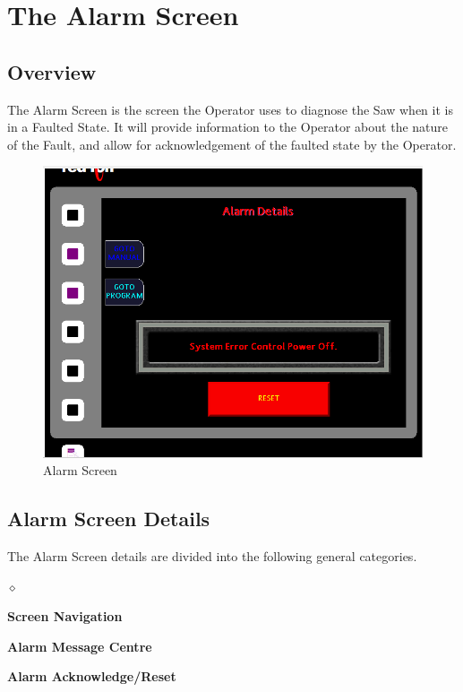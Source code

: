 \chapter{The Alarm Screen}
\section{Overview}
The Alarm Screen is the screen the Operator uses to diagnose the Saw when it is in a Faulted State. It will provide information to the Operator about the nature of the Fault, and allow for acknowledgement of the faulted state by the Operator.
\begin{figure}
	\centering
	\includegraphics[width=0.5
	\linewidth]{screen-captures/alarms}
	\caption{Alarm Screen}
	\label{fig:alarm-screen}
\end{figure}
\pagebreak
\section{Alarm Screen Details}
The Alarm Screen details are divided into the following general categories.
\begin{list}{$\diamond$}{}
	\item \textbf{Screen Navigation}
	\item \textbf{Alarm Message Centre}
	\item \textbf{Alarm Acknowledge/Reset}
\end{list}
